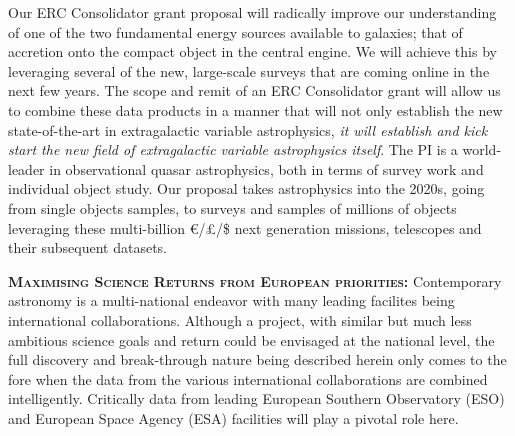 \smallskip
\smallskip
\noindent
Our ERC Consolidator grant proposal will radically improve our
understanding of one of the two fundamental energy sources available
to galaxies; that of accretion onto the compact object in the central
engine. We will achieve this by leveraging several of the new,
large-scale surveys that are coming online in the next few years.  The
scope and remit of an ERC Consolidator grant will allow us to combine
these data products in a manner that will not only establish the new
state-of-the-art in extragalactic variable astrophysics, {\it it will
establish and kick start the new field of extragalactic variable
astrophysics itself}.  The PI is a world-leader in observational quasar
astrophysics, both in terms of survey work and individual object
study.  Our proposal takes astrophysics into the 2020s, going from
single objects samples, to surveys and samples of millions of objects
leveraging these multi-billion \euro/\pounds/\$ next generation
missions, telescopes and their subsequent datasets.



\smallskip
\smallskip
\noindent
\textbf{\textsc{Maximising Science Returns from European priorities:}}
Contemporary astronomy is a multi-national endeavor with many leading
facilites being international collaborations. Although a project, with
similar but much less ambitious science goals and return could be
envisaged at the national level, the full discovery and break-through
nature being described herein only comes to the fore when the data
from the various international collaborations are combined
intelligently.  Critically data from leading European Southern
Observatory (ESO) and European Space Agency (ESA) facilities will play
a pivotal role here.




\smallskip

